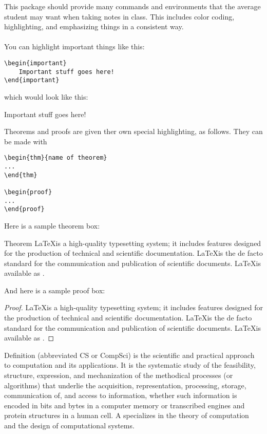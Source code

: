 \documentclass{notes}
\date{\today}
\begin{document}
This package should provide many commands and environments that the average student may want when taking notes in class. This includes color coding, highlighting, and emphasizing things in a consistent way.
\\
\\
You can highlight important things like this:

\begin{verbatim}
\begin{important}
    Important stuff goes here!
\end{important}
\end{verbatim}

which would look like this:

\begin{important}
    Important stuff goes here!
\end{important}
Theorems and proofs are given ther own special highlighting, as follows. They can be made with
\begin{verbatim}
\begin{thm}{name of theorem}
...
\end{thm}

\begin{proof}
...
\end{proof}
\end{verbatim}
Here is a sample theorem box:
\begin{thm}{Theorem}
\LaTeX is a high-quality typesetting system; it includes features designed for the production of technical and scientific documentation. \LaTeX is the de facto standard for the communication and publication of scientific documents. \LaTeX is available as . 
\end{thm}
And here is a sample proof box:
\begin{proof}
\LaTeX is a high-quality typesetting system; it includes features designed for the production of technical and scientific documentation. \LaTeX is the de facto standard for the communication and publication of scientific documents. \LaTeX is available as . 
\end{proof}

\begin{definition}{Definition}
 (abbreviated CS or CompSci) is the scientific and practical approach to computation and its applications. It is the systematic study of the feasibility, structure, expression, and mechanization of the methodical processes (or algorithms) that underlie the acquisition, representation, processing, storage, communication of, and access to information, whether such information is encoded in bits and bytes in a computer memory or transcribed engines and protein structures in a human cell. A  specializes in the theory of computation and the design of computational systems.
\end{definition}
\\



\end{document}
